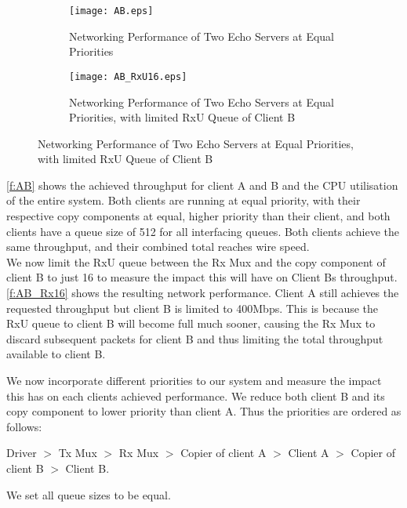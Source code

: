 \noindent\begin{figure}[htbp]
    \centering
	\begin{multicols}{2}
		\begin{subfigure}[b]{0.45\textwidth}
        \centering
        \texttt{[image: AB.eps]}
        \caption{Networking Performance of Two Echo Servers at Equal Priorities}
        \label{f:AB}
    \end{subfigure}\qquad
    \begin{subfigure}[b]{0.45\textwidth}
        \centering
        \texttt{[image: AB\_RxU16.eps]}
        \caption{Networking Performance of Two Echo Servers at Equal Priorities, with limited RxU Queue of Client B}
        \label{f:AB_Rx16}
    \end{subfigure}
\end{multicols}
\end{figure}

\autoref{f:AB} shows the achieved throughput for client A and B and the CPU utilisation of the entire system. 
Both clients are running at equal priority, with their respective copy components at equal, higher priority than their
client, and both clients have a queue size of 512 for all interfacing queues. Both clients achieve the same 
throughput, and their combined total reaches wire speed.\\

We now limit the RxU queue between the Rx Mux and the copy component of client B to just 16 to measure 
the impact this will have on Client Bs throughput. \autoref{f:AB_Rx16} shows the resulting network performance.
Client A still achieves the requested throughput but client B is limited to 400Mbps. This is because the RxU queue
to client B will become full much sooner, causing the Rx Mux to discard subsequent packets for client B and thus
limiting the total throughput available to client B. 

We now incorporate different priorities to our system and measure the impact this has on each clients
achieved performance. We reduce both client B and its copy component to lower priority than client A. 
Thus the priorities are ordered as follows:\\ 

\centerline{Driver \(>\) Tx Mux  \(>\) Rx Mux \(>\) Copier of client A \(>\) Client A \(>\) Copier of client B \(>\) Client B.}

We set all queue sizes to be equal. 

